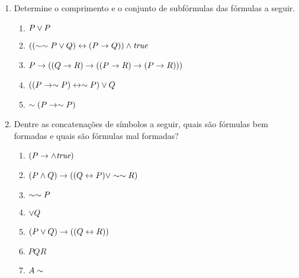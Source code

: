 \begin{enumerate}
  \item Determine o comprimento e o conjunto de subfórmulas das fórmulas a seguir.
    \begin{enumerate}
      \item $P \lor P$
      \item $((\sim \sim P \lor Q) \leftrightarrow (P \rightarrow Q)) \land \textit{true}$
      \item $P \rightarrow ((Q \rightarrow R) \rightarrow ((P \rightarrow R) \rightarrow (P \rightarrow R)))$
      \item $((P \rightarrow \sim P) \leftrightarrow \sim P) \lor Q$
      \item $\sim (P \rightarrow \sim P)$
    \end{enumerate}
  \item Dentre as concatenações de símbolos a seguir, quais são fórmulas bem formadas e quais são fórmulas mal formadas?
    \begin{enumerate}
      \item $(P \rightarrow \land \textit{true})$
      \item $(P \land Q) \rightarrow ((Q \leftrightarrow P) \lor \sim \sim R)$
      \item $\sim \sim P$
      \item $\lor Q$
      \item $(P \lor Q) \rightarrow ((Q \leftrightarrow R))$
      \item $PQR$
      \item $A \sim$
    \end{enumerate}


\end{enumerate}
